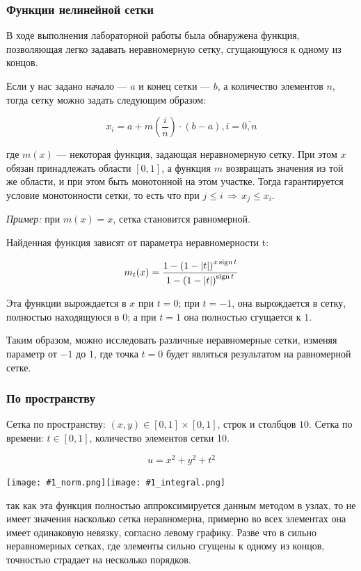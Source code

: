 \subsubsection{Функции нелинейной сетки}

В ходе выполнения лабораторной работы была обнаружена функция, позволяющая легко задавать неравномерную сетку, сгущающуюся к одному из концов.

Если у нас задано начало --- $a$ и конец сетки --- $b$, а количество элементов $n$, тогда сетку можно задать следующим образом:

$$ x_i = a + m\left(\frac{i}{n}\right) \cdot (b-a), i=\overline{0, n} $$

где $m(x)$ --- некоторая функция, задающая неравномерную сетку. При этом $x$ обязан принадлежать области $[0, 1]$, а функция $m$ возвращать значения из той же области, и при этом быть монотонной на этом участке. Тогда гарантируется условие монотонности сетки, то есть что при $j \leqslant i\, \Rightarrow\, x_j \leqslant x_i$. 

\textit{Пример:} при $m(x) = x$, сетка становится равномерной.

Найденная функция зависят от параметра неравномерности t:

$$ m_t(x) = \frac{1-\left(1-|t|\right)^{x\operatorname{sign} t}}{1-\left(1-|t|\right)^{\operatorname{sign} t}} $$

Эта функции вырождается в $x$ при $t=0$; при $t=-1$, она вырождается в сетку, полностью находящуюся в $0$; а при $t=1$ она полностью сгущается к $1$. 

Таким образом, можно исследовать различные неравномерные сетки, изменяя параметр от $-1$ до $1$, где точка $t=0$ будет являться результатом на равномерной сетке.

\subsubsection{По пространству}

Сетка по пространству: $ (x, y) \in [0, 1] \times [0, 1] $, строк и столбцов $10$. Сетка по времени: $ t \in [0, 1] $, количество элементов сетки 10.

\newcommand{\includetwoimages}[1]{
\noindent\texttt{[image: \#1\_norm.png]}\texttt{[image: \#1\_integral.png]}
}

$$ u = x^2 + y^2 + t^2 $$

\includetwoimages{space_tgrid_0}

\conclusion так как эта функция полностью аппроксимируется данным методом в узлах, то не имеет значения насколько сетка неравномерна, примерно во всех элементах она имеет одинаковую невязку, согласно левому графику. Разве что в сильно неравномерных сетках, где элементы сильно сгущены к одному из концов, точностью страдает на несколько порядков.

